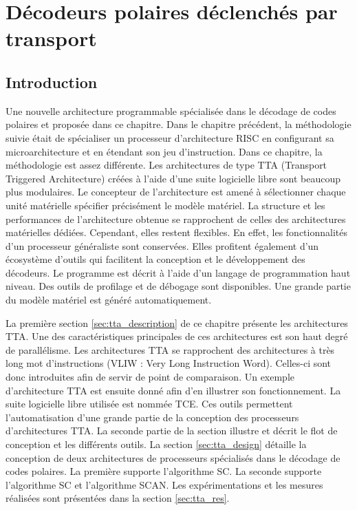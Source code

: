 \chapter{Décodeurs polaires déclenchés par transport} %
\label{chap:tta}

\vspace*{\fill}
\minitocTITI
\vspace*{\fill}
\newpage

\section*{Introduction}

Une nouvelle architecture programmable spécialisée dans le décodage de codes polaires et proposée dans ce chapitre.
Dans le chapitre précédent, la méthodologie suivie était de spécialiser un processeur d'architecture RISC en configurant sa microarchitecture et en étendant son jeu d'instruction.
Dans ce chapitre, la méthodologie est assez différente. Les architectures de type TTA (Transport Triggered Architecture) créées à l'aide d'une suite logicielle libre sont beaucoup plus modulaires. Le concepteur de l'architecture est amené à sélectionner chaque unité matérielle spécifier précisément le modèle matériel. La structure et les performances de l'architecture obtenue se rapprochent de celles des architectures matérielles dédiées. Cependant, elles restent flexibles. En effet, les fonctionnalités d'un processeur généraliste sont conservées. Elles profitent également d'un écosystème d'outils qui facilitent la conception et le développement des décodeurs. Le programme est décrit à l'aide d'un langage de programmation haut niveau. Des outils de profilage et de débogage sont disponibles. Une grande partie du modèle matériel est généré automatiquement.

La première section \ref{sec:tta_description} de ce chapitre présente les architectures TTA. Une des caractéristiques principales de ces architectures est son haut degré de parallélisme. Les architectures TTA se rapprochent des architectures à très long mot d'instructions (VLIW : Very Long Instruction Word). Celles-ci sont donc introduites afin de servir de point de comparaison. Un exemple d'architecture TTA est ensuite donné afin d'en illustrer son fonctionnement. La suite logicielle libre utilisée est nommée TCE. Ces outils permettent l'automatisation d'une grande partie de la conception des processeurs d'architectures TTA. La seconde partie de la section illustre et décrit le flot de conception et les différents outils. La section \ref{sec:tta_design} détaille la conception de deux architectures de processeurs spécialisés dans le décodage de codes polaires. La première supporte l'algorithme SC. La seconde supporte l'algorithme SC et l'algorithme SCAN. Les expérimentations et les mesures réalisées sont présentées dans la section \ref{sec:tta_res}.

